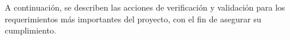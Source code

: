 \documentclass[
11pt, %
]{charter}
\begin{document}






A continuación, se describen las acciones de verificación y validación para los requerimientos más importantes del proyecto, con el fin de asegurar su cumplimiento.
\end{document}

